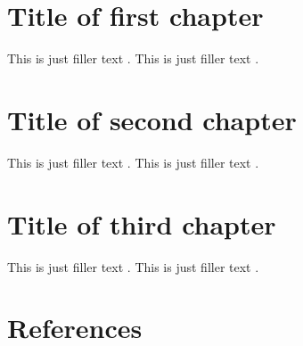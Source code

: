 \documentclass[a4paper,oneside]{book}
\begin{document}
\chapter{Title of first chapter}
\begin{refsegment}
This is just filler text \parencite{westfahl:space}.
This is just filler text \parencite{nietzsche:ksa}.
\end{refsegment}

\chapter{Title of second chapter}
\begin{refsegment}
This is just filler text \parencite{nietzsche:historie}.
This is just filler text \parencite{westfahl:frontier}.
\end{refsegment}

\chapter{Title of third chapter}
\begin{refsegment}
This is just filler text \parencite{aristotle:anima}.
This is just filler text \parencite{averroes/bland}.
\end{refsegment}

\chapter*{References}
\bibbysegment
%
%
\end{document}
